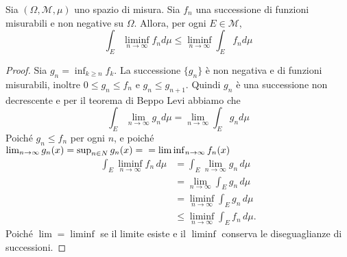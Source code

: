 \begin{lemmao}\label{le:fatou_base}
    Sia \((\Omega, \mathcal{M}, \mu)\) uno spazio di misura. Sia \(f_{n}\) una
    successione di funzioni misurabili e non negative su \(\Omega\). Allora, per
    ogni \(E \in \mathcal{M}\),
    \[
        \int_E \liminf_{n \to \infty} f_{n} d\mu \le \liminf_{n \to \infty}
        \int_E f_{n} d\mu
    \]
\end{lemmao}
\begin{proof}
    Sia \(g_{n} = \inf_{k \ge n} f_{k}\). La successione \(\{g_{n}\}\) è non negativa e
    di funzioni misurabili, inoltre \(0 \le g_{n} \le f_{n}\) e \(g_{n} \le
    g_{n+1} \). Quindi \(g_{n}\) è una successione non decrescente e
    per il teorema di Beppo Levi abbiamo che
    \[
        \int_E \lim_{n \to \infty} g_{n} d\mu = \lim_{n \to \infty} \int_E g_{n}
        d\mu
    \]
    Poiché \(g_{n} \le f_{n}\) per ogni \(n\), e poiché \(\lim_{n \to
    \infty} g_{n}(x) = \sup_{n \in N} g_{n}(x) =\\= \liminf_{n \to \infty} f_{n}(x)\) 
    \[
        \begin{aligned}
            \int_E \liminf_{n \to \infty} f_n \, d\mu 
            &= \int_E \lim_{n \to \infty} g_n \, d\mu \\
            &= \lim_{n \to \infty} \int_E g_n \, d\mu \\
            &= \liminf_{n \to \infty} \int_E g_n \, d\mu \\
            &\leq \liminf_{n \to \infty} \int_E f_n \, d\mu.
        \end{aligned}
    \]
    Poiché \(\lim = \liminf\) se il limite esiste e il \(\liminf\) conserva le diseguaglianze di
    successioni.
\end{proof}

